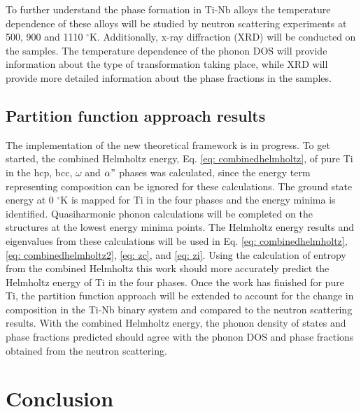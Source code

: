 To further understand the phase formation in Ti-Nb alloys the temperature dependence of these alloys will be studied by neutron scattering experiments at 500, 900 and 1110 $^\circ$K. Additionally, x-ray diffraction (XRD) will be conducted on the samples. The temperature dependence of the phonon DOS will provide information about the type of transformation taking place, while XRD will provide more detailed information about the phase fractions in the samples.

\subsection{Partition function approach results}

The implementation of the new theoretical framework is in progress. To get started, the combined Helmholtz energy, Eq. \ref{eq: combinedhelmholtz}, of pure Ti in the hcp, bcc, $\omega$ and $\alpha"$ phases was calculated, since the energy term representing composition can be ignored for these calculations. The ground state energy at 0 $^\circ$K is mapped for Ti in the four phases and the energy minima is identified. Quasiharmonic phonon calculations will be completed on the structures at the lowest energy minima points. The Helmholtz energy results and eigenvalues from these calculations will be used in Eq. \ref{eq: combinedhelmholtz}, \ref{eq: combinedhelmholtz2}, \ref{eq: zc}, and \ref{eq: zi}. Using the calculation of entropy from the combined Helmholtz this work should more accurately predict the Helmholtz energy of Ti in the four phases. Once the work has finished for pure Ti, the partition function approach will be extended to account for the change in composition in the Ti-Nb binary system and compared to the neutron scattering results. With the combined Helmholtz energy, the phonon density of states and phase fractions predicted should agree with the phonon DOS and phase fractions obtained from the neutron scattering.

\section{Conclusion}

